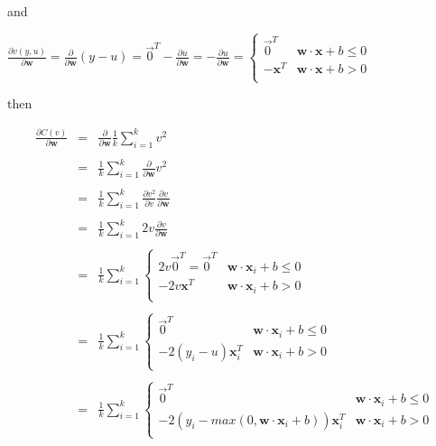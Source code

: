 \documentclass[11pt]{article}
\begin{document}
and

$\frac{\partial v(y,u)}{\partial \mathbf{w}} = \frac{\partial}{\partial \mathbf{w}} (y - u) = \vec{0}^T - \frac{\partial u}{\partial \mathbf{w}} = -\frac{\partial u}{\partial \mathbf{w}} = \begin{cases}
	\vec{0}^T & \mathbf{w} \cdot \mathbf{x} + b \leq 0\\
	-\mathbf{x}^T & \mathbf{w} \cdot \mathbf{x} + b > 0\\
\end{cases}$

then

\[
\begin{array}{ccl}
\frac{\partial C(v)}{\partial \mathbf{w}} & = & \frac{\partial }{\partial \mathbf{w}}\frac{1}{k} \sum_{i=1}^k v^2\\\\
 & = & \frac{1}{k} \sum_{i=1}^k \frac{\partial}{\partial \mathbf{w}} v^2\\\\
 & = & \frac{1}{k} \sum_{i=1}^k \frac{\partial v^2}{\partial v} \frac{\partial v}{\partial \mathbf{w}} \\\\
 & = & \frac{1}{k} \sum_{i=1}^k 2v \frac{\partial v}{\partial \mathbf{w}} \\\\
 & = & \frac{1}{k} \sum_{i=1}^k \begin{cases}
	2v\vec{0}^T = \vec{0}^T & \mathbf{w} \cdot \mathbf{x}_i + b \leq 0\\
	-2v\mathbf{x}^T & \mathbf{w} \cdot \mathbf{x}_i + b > 0\\
\end{cases}\\\\
 & = & \frac{1}{k} \sum_{i=1}^k \begin{cases}
	\vec{0}^T & \mathbf{w} \cdot \mathbf{x}_i + b \leq 0\\
	-2(y_i-u)\mathbf{x}_i^T & \mathbf{w} \cdot \mathbf{x}_i + b > 0\\
\end{cases}\\\\
 & = & \frac{1}{k} \sum_{i=1}^k \begin{cases}
	\vec{0}^T & \mathbf{w} \cdot \mathbf{x}_i + b \leq 0\\
	-2(y_i-max(0, \mathbf{w}\cdot\mathbf{x}_i+b))\mathbf{x}_i^T & \mathbf{w} \cdot \mathbf{x}_i + b > 0\\
\end{cases}\\\\

\end{array}\]
\end{document}

